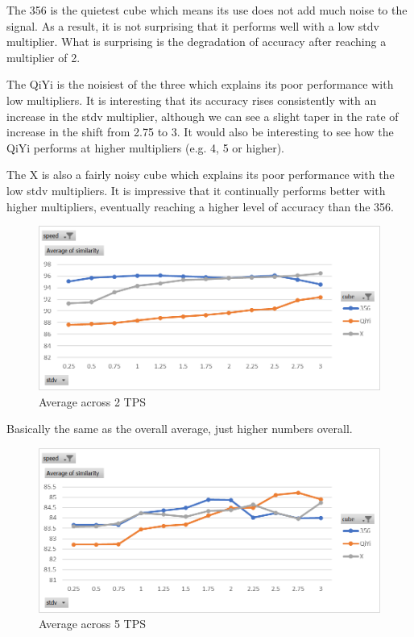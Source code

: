 The 356 is the quietest cube which means its use does not add much
noise to the signal. As a result, it is not surprising that it performs
well with a low stdv multiplier. What is surprising is the degradation
of accuracy after reaching a multiplier of 2.

The QiYi is the noisiest of the three which explains its poor
performance with low multipliers. It is interesting that its accuracy
rises consistently with an increase in the stdv multiplier, although we
can see a slight taper in the rate of increase in the shift from 2.75
to 3. It would also be interesting to see how the QiYi performs at
higher multipliers (e.g. 4, 5 or higher).

The X is also a fairly noisy cube which explains its poor performance
with the low stdv multipliers. It is impressive that it continually
performs better with higher multipliers, eventually reaching a higher
level of accuracy than the 356.

\begin{figure}[h]
    \centering
    \caption{Average across 2 TPS}
    \label{fig:similarity-by-cube-2tps}
    \includegraphics[width=0.75\linewidth]{Figures/7 Evaluation/similarity_by_cube_2tps.png}
\end{figure}

Basically the same as the overall average, just higher numbers overall.

\begin{figure}[h]
    \centering
    \caption{Average across 5 TPS}
    \label{fig:similarity-by-cube-5tps}
    \includegraphics[width=0.75\linewidth]{Figures/7 Evaluation/similarity_by_cube_5tps.png}
\end{figure}

